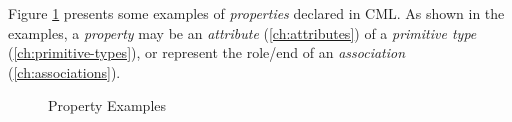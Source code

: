 Figure \ref{fig:ex:properties} presents some examples of \emph{properties} declared in CML.
As shown in the examples,
a \emph{property} may be an \emph{attribute} (\ref{ch:attributes})
of a \emph{primitive type} (\ref{ch:primitive-types}),
or represent the role/end of an \emph{association} (\ref{ch:associations}).

\begin{figure}
\verbatimfont{\small}

\caption{Property Examples}
\label{fig:ex:properties}
\end{figure}
